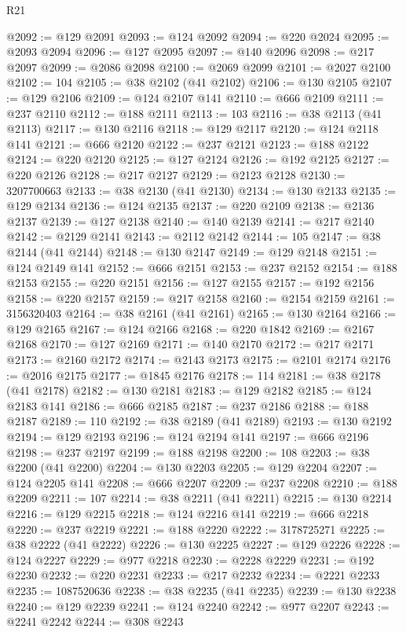 \begin{lexlean}{R21}
\begin{coremodule}
@2092 := @129 @2091
@2093 := @124 @2092
@2094 := @220 @2024
@2095 := @2093 @2094
@2096 := @127 @2095
@2097 := @140 @2096
@2098 := @217 @2097
@2099 := @2086 @2098
@2100 := @2069 @2099
@2101 := @2027 @2100
@2102 := 104
@2105 := @38 @2102 (@41 @2102)
@2106 := @130 @2105
@2107 := @129 @2106
@2109 := @124 @2107 @141
@2110 := @666 @2109
@2111 := @237 @2110
@2112 := @188 @2111
@2113 := 103
@2116 := @38 @2113 (@41 @2113)
@2117 := @130 @2116
@2118 := @129 @2117
@2120 := @124 @2118 @141
@2121 := @666 @2120
@2122 := @237 @2121
@2123 := @188 @2122
@2124 := @220 @2120
@2125 := @127 @2124
@2126 := @192 @2125
@2127 := @220 @2126
@2128 := @217 @2127
@2129 := @2123 @2128
@2130 := 3207700663
@2133 := @38 @2130 (@41 @2130)
@2134 := @130 @2133
@2135 := @129 @2134
@2136 := @124 @2135
@2137 := @220 @2109
@2138 := @2136 @2137
@2139 := @127 @2138
@2140 := @140 @2139
@2141 := @217 @2140
@2142 := @2129 @2141
@2143 := @2112 @2142
@2144 := 105
@2147 := @38 @2144 (@41 @2144)
@2148 := @130 @2147
@2149 := @129 @2148
@2151 := @124 @2149 @141
@2152 := @666 @2151
@2153 := @237 @2152
@2154 := @188 @2153
@2155 := @220 @2151
@2156 := @127 @2155
@2157 := @192 @2156
@2158 := @220 @2157
@2159 := @217 @2158
@2160 := @2154 @2159
@2161 := 3156320403
@2164 := @38 @2161 (@41 @2161)
@2165 := @130 @2164
@2166 := @129 @2165
@2167 := @124 @2166
@2168 := @220 @1842
@2169 := @2167 @2168
@2170 := @127 @2169
@2171 := @140 @2170
@2172 := @217 @2171
@2173 := @2160 @2172
@2174 := @2143 @2173
@2175 := @2101 @2174
@2176 := @2016 @2175
@2177 := @1845 @2176
@2178 := 114
@2181 := @38 @2178 (@41 @2178)
@2182 := @130 @2181
@2183 := @129 @2182
@2185 := @124 @2183 @141
@2186 := @666 @2185
@2187 := @237 @2186
@2188 := @188 @2187
@2189 := 110
@2192 := @38 @2189 (@41 @2189)
@2193 := @130 @2192
@2194 := @129 @2193
@2196 := @124 @2194 @141
@2197 := @666 @2196
@2198 := @237 @2197
@2199 := @188 @2198
@2200 := 108
@2203 := @38 @2200 (@41 @2200)
@2204 := @130 @2203
@2205 := @129 @2204
@2207 := @124 @2205 @141
@2208 := @666 @2207
@2209 := @237 @2208
@2210 := @188 @2209
@2211 := 107
@2214 := @38 @2211 (@41 @2211)
@2215 := @130 @2214
@2216 := @129 @2215
@2218 := @124 @2216 @141
@2219 := @666 @2218
@2220 := @237 @2219
@2221 := @188 @2220
@2222 := 3178725271
@2225 := @38 @2222 (@41 @2222)
@2226 := @130 @2225
@2227 := @129 @2226
@2228 := @124 @2227
@2229 := @977 @2218
@2230 := @2228 @2229
@2231 := @192 @2230
@2232 := @220 @2231
@2233 := @217 @2232
@2234 := @2221 @2233
@2235 := 1087520636
@2238 := @38 @2235 (@41 @2235)
@2239 := @130 @2238
@2240 := @129 @2239
@2241 := @124 @2240
@2242 := @977 @2207
@2243 := @2241 @2242
@2244 := @308 @2243

\end{coremodule}
\end{lexlean}
